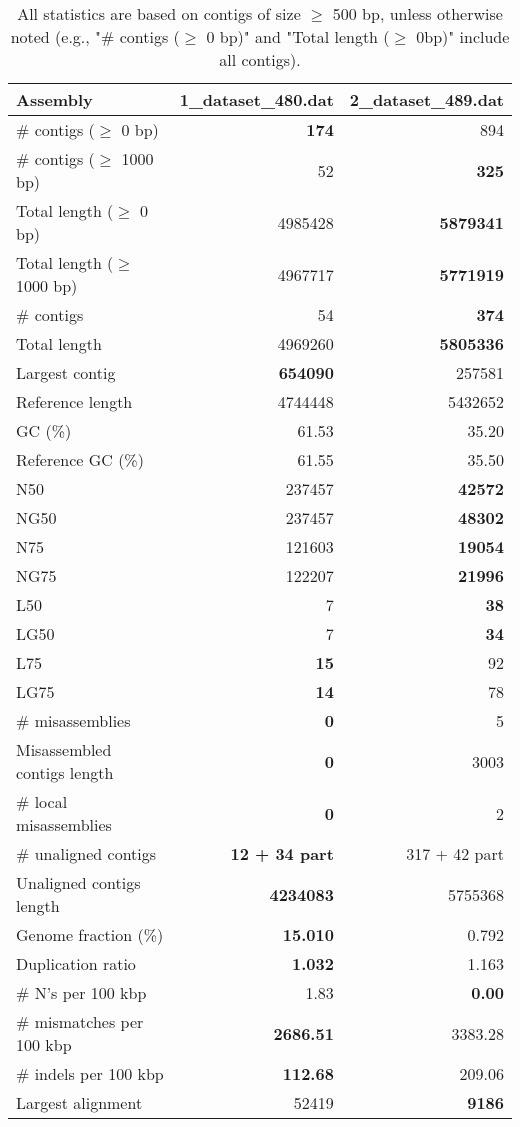 \documentclass[12pt,a4paper]{article}
\begin{document}
\begin{table}[ht]
\begin{center}
\caption{All statistics are based on contigs of size $\geq$ 500 bp, unless otherwise noted (e.g., "\# contigs ($\geq$ 0 bp)" and "Total length ($\geq$ 0bp)" include all contigs).}
\begin{tabular}{|l*{2}{|r}|}
\hline
Assembly & 1\_dataset\_480.dat & 2\_dataset\_489.dat \\ \hline
\# contigs ($\geq$ 0 bp) & {\bf 174} & 894 \\ \hline
\# contigs ($\geq$ 1000 bp) & 52 & {\bf 325} \\ \hline
Total length ($\geq$ 0 bp) & 4985428 & {\bf 5879341} \\ \hline
Total length ($\geq$ 1000 bp) & 4967717 & {\bf 5771919} \\ \hline
\# contigs & 54 & {\bf 374} \\ \hline
Total length & 4969260 & {\bf 5805336} \\ \hline
Largest contig & {\bf 654090} & 257581 \\ \hline
Reference length & 4744448 & 5432652 \\ \hline
GC (\%) & 61.53 & 35.20 \\ \hline
Reference GC (\%) & 61.55 & 35.50 \\ \hline
N50 & 237457 & {\bf 42572} \\ \hline
NG50 & 237457 & {\bf 48302} \\ \hline
N75 & 121603 & {\bf 19054} \\ \hline
NG75 & 122207 & {\bf 21996} \\ \hline
L50 & 7 & {\bf 38} \\ \hline
LG50 & 7 & {\bf 34} \\ \hline
L75 & {\bf 15} & 92 \\ \hline
LG75 & {\bf 14} & 78 \\ \hline
\# misassemblies & {\bf 0} & 5 \\ \hline
Misassembled contigs length & {\bf 0} & 3003 \\ \hline
\# local misassemblies & {\bf 0} & 2 \\ \hline
\# unaligned contigs & {\bf 12 + 34 part} & 317 + 42 part \\ \hline
Unaligned contigs length & {\bf 4234083} & 5755368 \\ \hline
Genome fraction (\%) & {\bf 15.010} & 0.792 \\ \hline
Duplication ratio & {\bf 1.032} & 1.163 \\ \hline
\# N's per 100 kbp & 1.83 & {\bf 0.00} \\ \hline
\# mismatches per 100 kbp & {\bf 2686.51} & 3383.28 \\ \hline
\# indels per 100 kbp & {\bf 112.68} & 209.06 \\ \hline
Largest alignment & 52419 & {\bf 9186} \\ \hline
\end{tabular}
\end{center}
\end{table}
\end{document}
